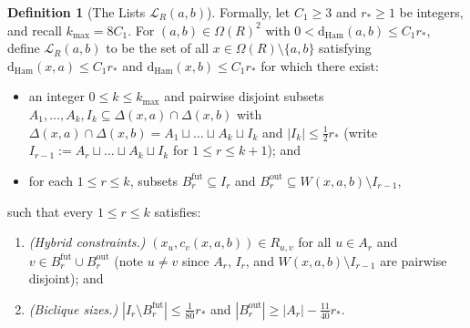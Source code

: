 \documentclass[11pt]{article}
\theoremstyle{definition}
\newtheorem{definition}[theorem]{Definition}
\theoremstyle{remark}
\newcommand{\Ham}{\mathrm{Ham}}
\newcommand{\dHam}{\mathrm{d}_{\Ham}}
\begin{document}
\begin{definition}[The Lists $\mathcal{L}_R(a, b)$]
Formally, let $C_1 \ge 3$ and $r_* \ge 1$ be integers, and recall $k_{\max} = 8 C_1$. For $(a, b) \in \Omega(R)^2$ with $0 < \dHam(a, b) \le C_1 r_*$, define $\mathcal{L}_R(a, b)$ to be the set of all $x \in \Omega(R) \setminus \{a, b\}$ satisfying $\dHam(x, a) \le C_1 r_*$ and $\dHam(x, b) \le C_1 r_*$ for which there exist:
\begin{itemize}[leftmargin=2em,nosep,topsep=3pt,itemsep=2pt]
  \item an integer $0 \le k \le k_{\max}$ and pairwise disjoint subsets $A_1, \dots, A_k, I_k \subseteq \Delta(x, a) \cap \Delta(x, b)$ with $\Delta(x, a) \cap \Delta(x, b) = A_1 \sqcup \dots \sqcup A_k \sqcup I_k$ and $|I_k| \le \frac{1}{2} r_*$ (write $I_{r-1} := A_r \sqcup \dots \sqcup A_k \sqcup I_k$ for $1 \le r \le k + 1$); and
  \item for each $1 \le r \le k$, subsets $B_r^{\mathrm{fut}} \subseteq I_r$ and $B_r^{\mathrm{out}} \subseteq W(x, a, b) \setminus I_{r-1}$,
\end{itemize}
such that every $1 \le r \le k$ satisfies:
\begin{enumerate}[label=(\arabic*),leftmargin=2em,nosep,topsep=3pt,itemsep=2pt]
  \item \emph{(Hybrid constraints.)} $(x_u, c_v(x, a, b)) \in R_{u, v}$ for all $u \in A_r$ and $v \in B_r^{\mathrm{fut}} \cup B_r^{\mathrm{out}}$ (note $u \ne v$ since $A_r$, $I_r$, and $W(x, a, b) \setminus I_{r-1}$ are pairwise disjoint); and
  \item \emph{(Biclique sizes.)} $|I_r \setminus B_r^{\mathrm{fut}}| \le \frac{1}{80} r_*$ and $|B_r^{\mathrm{out}}| \ge |A_r| - \frac{11}{40} r_*$.
\end{enumerate}
\end{definition}
\end{document}
